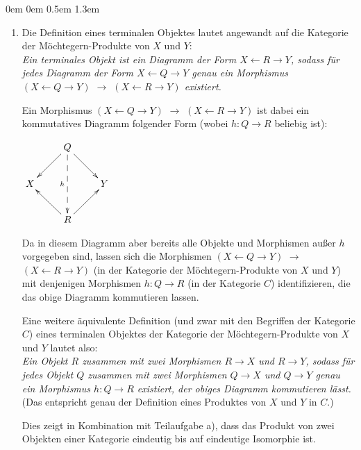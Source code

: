 \documentclass[a4paper,ngerman]{scrartcl}
\theoremstyle{definition}
\theoremstyle{plain}
\theoremstyle{remark}
\begin{document}
\begin{list}{}{0em \leftmargin0em \itemindent0.5em \itemsep 1.3em}
\begin{enumerate}
\item
Die Definition eines terminalen Objektes lautet angewandt auf die Kategorie der Möchtegern-Produkte von $X$ und $Y$:\\
\emph{
Ein terminales Objekt ist ein Diagramm der Form \mbox{$X\leftarrow R\to Y$}, sodass für jedes Diagramm der Form \mbox{$X\leftarrow Q\to Y$} genau ein Morphismus \mbox{$(X\leftarrow Q\to Y)$} $\to$ \mbox{$(X\leftarrow R\to Y)$} existiert.
}

Ein Morphismus \mbox{$(X\leftarrow Q\to Y)$} $\to$ \mbox{$(X\leftarrow R\to Y)$} ist dabei ein kommutatives Diagramm folgender Form (wobei $h:Q\to R$ beliebig ist):
\begin{center}
$\xymatrix{
 & Q \ar[ld]\ar[rd]\ar@{-->}[dd]_h & \\
X & & Y \\
 & R \ar[lu]\ar[ru] &
}$
\end{center}
Da in diesem Diagramm aber bereits alle Objekte und Morphismen außer $h$ vorgegeben sind, lassen sich die Morphismen \mbox{$(X\leftarrow Q\to Y)$} $\to$ \mbox{$(X\leftarrow R\to Y)$} (in der Kategorie der Möchtegern-Produkte von $X$ und $Y$) mit denjenigen Morphismen $h:Q\to R$ (in der Kategorie $C$) identifizieren, die das obige Diagramm kommutieren lassen.

Eine weitere äquivalente Definition (und zwar mit den Begriffen der Kategorie $C$) eines terminalen Objektes der Kategorie der Möchtegern-Produkte von $X$ und $Y$ lautet also:\\
\emph{
Ein Objekt $R$ zusammen mit zwei Morphismen $R\to X$ und $R\to Y$, sodass für jedes Objekt $Q$ zusammen mit zwei Morphismen $Q\to X$ und $Q\to Y$ genau ein Morphismus $h:Q\to R$ existiert, der obiges Diagramm kommutieren lässt.
}\\
(Das entspricht genau der Definition eines Produktes von $X$ und $Y$ in $C$.)

Dies zeigt in Kombination mit Teilaufgabe a), dass das Produkt von zwei Objekten einer Kategorie eindeutig bis auf eindeutige Isomorphie ist.
\end{enumerate}



\end{list}
\end{document}
